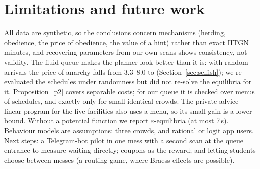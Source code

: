 \documentclass{article}
\begin{document}
\section{Limitations and future work}\label{sec:limits}
All data are synthetic, so the conclusions concern mechanisms (herding, obedience, the price of obedience, the value
of a hint) rather than exact IITGN minutes, and recovering parameters from our own scans shows consistency, not
validity. The fluid queue makes the planner look better than it is: with random arrivals the price of anarchy falls
from 3.3--8.0 to \PoaRandom{} (Section~\ref{sec:selfish}); we re-evaluated the schedules under randomness but did not
re-solve the equilibria for it. Proposition~\ref{p2} covers separable costs; for our queue it is checked over menus of
schedules, and exactly only for small identical crowds. The private-advice linear program for the five facilities
also uses a menu, so its small gain is a lower bound. Without a potential function we report $\varepsilon$-equilibria
(at most 7\,s). Behaviour models are assumptions: three crowds, and rational or logit app users. Next steps: a
Telegram-bot pilot in one mess with a second scan at the queue entrance to measure waiting directly; coupons as the
reward; and letting students choose between messes (a routing game, where Braess effects are possible).

\end{document}
